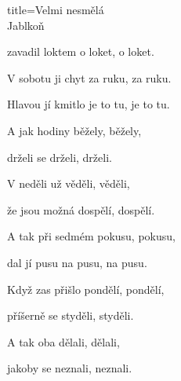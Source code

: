 \begin{song}{title=\predtitle\centering Velmi nesmělá \\\large Jablkoň  \vspace*{-0.3cm}}
\begin{centerjustified}
\begin{varwidth}[t]{0.48\textwidth}
	zavadil loktem o loket, o loket.

\end{varwidth}\mezisloupci\begin{varwidth}[t]{0.48\textwidth}\setlength{\parindent}{0.45cm}\vspace*{0.55cm}  %
\vspace*{-.185cm}
\sloka
	V sobotu ji chyt za ruku, za ruku.
	
	Hlavou jí kmitlo je to tu, je to tu.
	
	A jak hodiny běžely, běžely,
	
	drželi se drželi, drželi.


	
\sloka
	V neděli už věděli, věděli,

	že jsou možná dospělí, dospělí.
	
	A tak při sedmém pokusu, pokusu,
	
	dal jí pusu na pusu, na pusu.


\sloka
	Když zas přišlo pondělí, pondělí,
	
	příšerně se styděli, styděli.
	
	A tak oba dělali, dělali,
	
	jakoby se neznali, neznali.

\end{varwidth}

\end{centerjustified}
\setcounter{Slokočet}{0}
\end{song}

